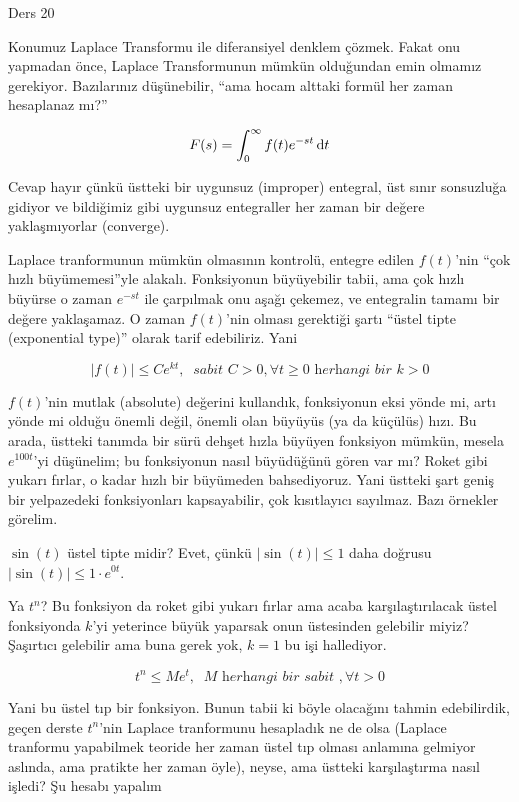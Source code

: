 \documentclass[12pt,fleqn]{article}\usepackage{../../common}
\begin{document}
Ders 20

Konumuz Laplace Transformu ile diferansiyel denklem çözmek. Fakat onu
yapmadan önce, Laplace Transformunun mümkün olduğundan emin olmamız
gerekiyor. Bazılarınız düşünebilir, ``ama hocam alttaki formül her zaman
hesaplanaz mı?''

$$ F(s) = \int_0^{\infty} f(t)e^{-st} \,\mathrm{d} t $$

Cevap hayır çünkü üstteki bir uygunsuz (improper) entegral, üst sınır
sonsuzluğa gidiyor ve bildiğimiz gibi uygunsuz entegraller her zaman bir
değere yaklaşmıyorlar (converge). 

Laplace tranformunun mümkün olmasının kontrolü, entegre edilen $f(t)$'nin
``çok hızlı büyümemesi''yle alakalı. Fonksiyonun büyüyebilir tabii, ama
çok hızlı büyürse o zaman $e^{-st}$ ile çarpılmak onu aşağı çekemez, ve
entegralin tamamı bir değere yaklaşamaz. O zaman $f(t)$'nin olması
gerektiği şartı ``üstel tipte (exponential type)'' olarak tarif
edebiliriz. Yani 

$$ |f(t)| \le C e^{kt}, \ \textit{ sabit } C > 0, \forall t \ge 0 
\textit{ herhangi bir } k > 0
$$

$f(t)$'nin mutlak (absolute) değerini kullandık, fonksiyonun eksi yönde mi,
artı yönde mi olduğu önemli değil, önemli olan büyüyüs (ya da küçülüs)
hızı. Bu arada, üstteki tanımda bir sürü dehşet hızla büyüyen fonksiyon
mümkün, mesela $e^{100t}$'yi düşünelim; bu fonksiyonun nasıl büyüdüğünü
gören var mı? Roket gibi yukarı fırlar, o kadar hızlı bir büyümeden
bahsediyoruz. Yani üstteki şart geniş bir yelpazedeki fonksiyonları
kapsayabilir, çok kısıtlayıcı sayılmaz. Bazı örnekler görelim.

$\sin(t)$ üstel tipte midir? Evet, çünkü $|\sin(t)| \le 1$ daha doğrusu
$|\sin(t)| \le 1 \cdot e^{0t}$. 

Ya $t^n$? Bu fonksiyon da roket gibi yukarı fırlar ama acaba
karşılaştırılacak üstel fonksiyonda $k$'yi yeterince büyük yaparsak onun
üstesinden gelebilir miyiz? Şaşırtıcı gelebilir ama buna gerek yok, $k=1$
bu işi hallediyor. 

$$ t^n \le M e^t, \ \textit{ M herhangi bir sabit }, \forall t > 0 $$

Yani bu üstel tıp bir fonksiyon. Bunun tabii ki böyle olacağını tahmin
edebilirdik, geçen derste $t^n$'nin Laplace tranformunu hesapladık ne de
olsa (Laplace tranformu yapabilmek teoride her zaman üstel tıp olması
anlamına gelmiyor aslında, ama pratikte her zaman öyle), neyse, ama üstteki
karşılaştırma nasıl işledi? Şu hesabı yapalım
\end{document}
